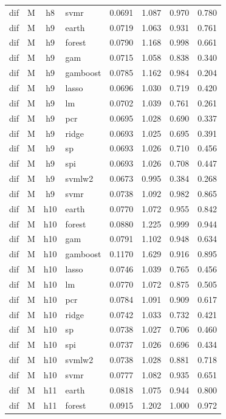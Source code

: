 \begin{ThreePartTable}
\begin{longtable}[t]{llclcccc}
dif & M & h8 & svmr & 0.0691 & 1.087 & 0.970 & 0.780\\
\addlinespace
dif & M & h9 & earth & 0.0719 & 1.063 & 0.931 & 0.761\\
dif & M & h9 & forest & 0.0790 & 1.168 & 0.998 & 0.661\\
dif & M & h9 & gam & 0.0715 & 1.058 & 0.838 & 0.340\\
dif & M & h9 & gamboost & 0.0785 & 1.162 & 0.984 & 0.204\\
dif & M & h9 & lasso & 0.0696 & 1.030 & 0.719 & 0.420\\
dif & M & h9 & lm & 0.0702 & 1.039 & 0.761 & 0.261\\
dif & M & h9 & pcr & 0.0695 & 1.028 & 0.690 & 0.337\\
dif & M & h9 & ridge & 0.0693 & 1.025 & 0.695 & 0.391\\
dif & M & h9 & sp & 0.0693 & 1.026 & 0.710 & 0.456\\
dif & M & h9 & spi & 0.0693 & 1.026 & 0.708 & 0.447\\
dif & M & h9 & svmlw2 & 0.0673 & 0.995 & 0.384 & 0.268\\
dif & M & h9 & svmr & 0.0738 & 1.092 & 0.982 & 0.865\\
\addlinespace
dif & M & h10 & earth & 0.0770 & 1.072 & 0.955 & 0.842\\
dif & M & h10 & forest & 0.0880 & 1.225 & 0.999 & 0.944\\
dif & M & h10 & gam & 0.0791 & 1.102 & 0.948 & 0.634\\
dif & M & h10 & gamboost & 0.1170 & 1.629 & 0.916 & 0.895\\
dif & M & h10 & lasso & 0.0746 & 1.039 & 0.765 & 0.456\\
dif & M & h10 & lm & 0.0770 & 1.072 & 0.875 & 0.505\\
dif & M & h10 & pcr & 0.0784 & 1.091 & 0.909 & 0.617\\
dif & M & h10 & ridge & 0.0742 & 1.033 & 0.732 & 0.421\\
dif & M & h10 & sp & 0.0738 & 1.027 & 0.706 & 0.460\\
dif & M & h10 & spi & 0.0737 & 1.026 & 0.696 & 0.434\\
dif & M & h10 & svmlw2 & 0.0738 & 1.028 & 0.881 & 0.718\\
dif & M & h10 & svmr & 0.0777 & 1.082 & 0.935 & 0.651\\
\addlinespace
dif & M & h11 & earth & 0.0818 & 1.075 & 0.944 & 0.800\\
dif & M & h11 & forest & 0.0915 & 1.202 & 1.000 & 0.972\\

\end{longtable}
\end{ThreePartTable}
